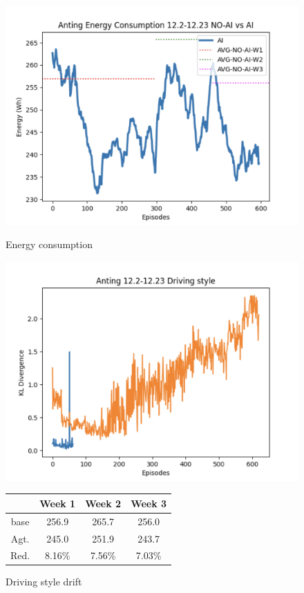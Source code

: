 \documentclass{article}
\begin{document}
\begin{figure}[hbtp]
	\begin{minipage}[b]{0.3\linewidth}
		\centering
		\includegraphics[width=\textwidth]{images/openroad_a_consumption.png}
		\caption{Energy consumption}\label{fig:openroad a consumption}
	\end{minipage}
	\hfill
	\begin{minipage}[b]{0.3\linewidth}
		\centering
		\includegraphics[width=\textwidth]{images/openroad_a_style.png}
		\caption{Driving style drift}\label{fig:openroad a style}
	\end{minipage}
	\hfill
	\begin{minipage}[b]{0.3\linewidth}
		\centering
		\begin{tabular}{c c c c}
			\toprule
			     & Week 1 & Week 2 & Week 3 \\
			\midrule
			base & 256.9  & 265.7  & 256.0  \\
			Agt. & 245.0  & 251.9  & 243.7  \\
			Red. & 8.16\% & 7.56\% & 7.03\% \\
			\bottomrule
		\end{tabular}
	\end{minipage}\hfill
\end{figure}
\end{document}
